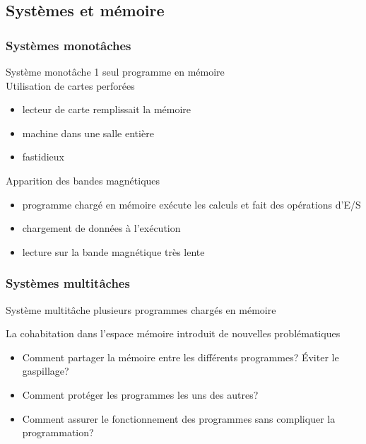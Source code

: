 \subsection{Systèmes et mémoire}
\begin{frame}
  \frametitle{Systèmes monotâches}
  \alert{Système monotâche}  1 seul programme en mémoire\\
  \vspace{0.5cm}
  Utilisation de cartes perforées
  \begin{itemize}
  \item lecteur de carte remplissait la mémoire
  \item machine dans une salle entière
  \item fastidieux
  \end{itemize}
  Apparition des bandes magnétiques
  \begin{itemize}
  \item programme chargé en mémoire exécute les calculs et fait des opérations d'E/S
  \item[\ding{212}] chargement de données à l'exécution
  \item lecture sur la bande magnétique très lente
  \end{itemize}
\end{frame}

\begin{frame}
  \frametitle{Systèmes multitâches}
  \alert{Système multitâche}  plusieurs programmes chargés en mémoire\\
  \vspace{0.5cm}
  
  La \alert{cohabitation} dans l'\alert{espace mémoire}
  introduit de nouvelles problématiques
  \begin{itemize}
  \item Comment partager la mémoire entre les différents programmes? Éviter le
    gaspillage? 
  \item Comment protéger les programmes les uns des autres? 
  \item Comment assurer le fonctionnement des programmes sans compliquer la
    programmation? 
  \end{itemize}
\end{frame}




